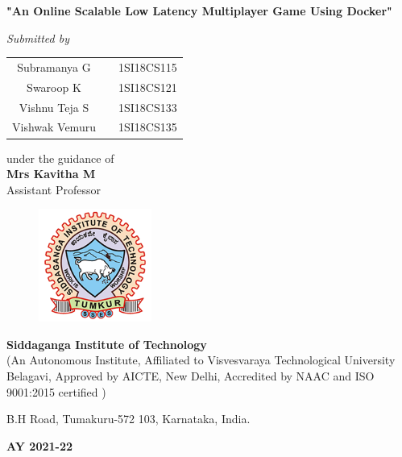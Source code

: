 \begin{titlingpage}
\begin{LARGE}
	\textbf{"An Online Scalable Low Latency Multiplayer Game Using Docker"}
\end{LARGE}

\begin{small}
	\emph{Submitted by}
\end{small}

\vfill
\begin{tabular}{ccc}
\Large{Subramanya G}&  &\Large{1SI18CS115}\\
\Large{Swaroop K}&  &\Large{1SI18CS121}\\
\Large{Vishnu Teja S}&  &\Large{1SI18CS133}\\
\Large{Vishwak Vemuru}&  &\Large{1SI18CS135}\\
\end{tabular}
\vfill

{\normalsize under the guidance of}\\
\Large{\textbf{Mrs Kavitha M}}\\
Assistant Professor\\
\vfill
\begin{figure}[h]
    \centering
    \includegraphics[height=3.7cm]{images/sit.png}
\end{figure}

\LARGE{\textbf{Siddaganga Institute of Technology}\\}
{\normalsize (An Autonomous Institute, Affiliated to Visvesvaraya Technological University Belagavi, 
	Approved by AICTE, New Delhi, Accredited by NAAC and ISO 9001:2015 certified
	)} \\

\begin{normalsize}
B.H Road, Tumakuru-572 103, Karnataka, India.\\
\end{normalsize}

\Large{\textbf{AY 2021-22}}
\end{titlingpage}
